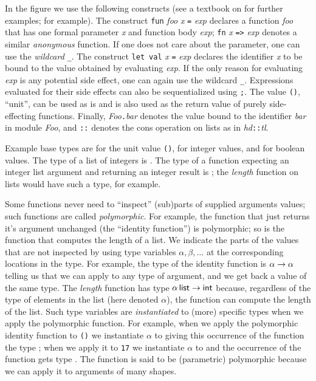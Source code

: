 \documentclass[workingdraft,endnotes]{usetex-v1}
\begin{document}
In the figure we use the following \sml constructs
(see a textbook on \sml for further examples;
\cite{Hansen-Rischel:1999,Paulson:1996} for example). The construct
\texttt{fun} \textit{foo} \textit{x} \texttt{=} \textit{exp} declares
a function \textit{foo} that has one formal parameter \textit{x} and
function body \textit{exp}; \texttt{fn} \textit{x} \texttt{=>}
\textit{exp} denotes a similar \emph{anonymous} function. If one does
not care about the parameter, one can use the \emph{wildcard}
\texttt{\_}. The construct \texttt{let}~\texttt{val} \textit{x} \texttt{=}
\textit{exp} declares the identifier \textit{x} to be bound to the
value obtained by evaluating \textit{exp}. If the only reason
for evaluating \textit{exp} is any potential side effect, one
can again use the wildcard \texttt{\_}. Expressions evaluated for
their side effects can also be sequentialized using \texttt{;}.
The value \texttt{()}, ``unit'', can be used as is and is also used
as the return value of purely side-effecting functions.
Finally, \textit{Foo}\texttt{.}\textit{bar} denotes the value bound
to the identifier \textit{bar} in module \textit{Foo}, and
\texttt{::} denotes the cons operation on lists as in
\textit{hd}\texttt{::}\textit{tl}.

Example base types are {\tUnit} for the unit value \texttt{()},
{\tInt} for integer values, and {\tBool} for boolean values. The type
of a list of integers is \tList{\tInt}. The type of a function
expecting an integer list argument and returning an integer result is
\tArrow{(\tList\tInt)}{\tInt}; the \textit{length} function on lists
would have such a type, for example. 

Some functions never need to
``inspect'' (sub)parts of supplied arguments values; such functions
are called \emph{polymorphic}. For example, the function that just
returns it's argument unchanged (the ``identity function'') is
polymorphic; so is the function that computes the length of a list. We
indicate the parts of the values that are not inspected by using type
variables $\alpha, \beta, \ldots$ at the corresponding locations in
the type. For example, the type of the identity function is
${\alpha}\rightarrow{\alpha}$ telling us that we can apply to any type of
argument, and we get back a value of the same type. The
\textit{length} function has type ${{\alpha}\,\textsf{list}}\rightarrow{\textsf{int}}$
because, regardless of the type of elements in the list (here denoted
$\alpha$), the function can compute the length of the list. Such type
variables are \emph{instantiated} to (more) specific types when we
apply the polymorphic function. For example, when we apply the
polymorphic identity function to \texttt{()} we instantiate $\alpha$
to {\tUnit} giving this occurrence of the function the type
\tArrow\tUnit\tUnit; when we apply it to \texttt{17} we instantiate
$\alpha$ to {\tInt} and the occurrence of the function gets type
\tArrow\tInt\tInt. The function is said to be (parametric) polymorphic
because we can apply it to arguments of many shapes.
\end{document}
